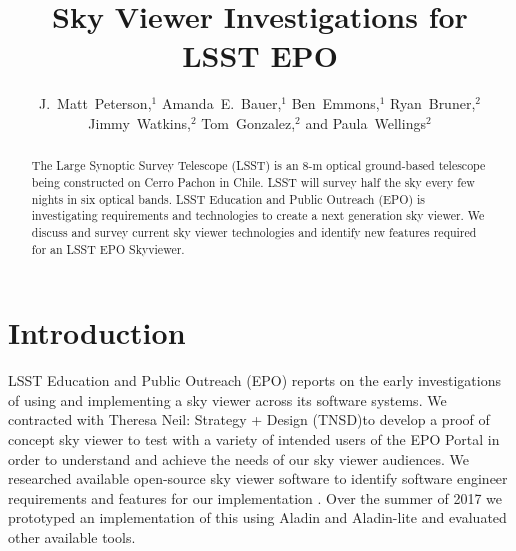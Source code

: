 \documentclass[11pt,twoside]{article}
\begin{document}
\title{Sky Viewer Investigations for LSST EPO}

\author{J.~Matt~Peterson,$^1$ Amanda~E.~Bauer,$^1$ Ben~Emmons,$^1$ Ryan~Bruner,$^2$ Jimmy~Watkins,$^2$ Tom~Gonzalez,$^2$ and Paula~Wellings$^2$}


\begin{abstract}
The Large Synoptic Survey Telescope (LSST) is an 8-m optical ground-based telescope being constructed on Cerro Pachon in Chile. LSST will survey half the sky every few nights in six optical bands. LSST Education and Public Outreach (EPO) is investigating requirements and technologies to create a next generation sky viewer. We discuss and survey current sky viewer technologies and identify new features required for an LSST EPO Skyviewer.
\end{abstract}

\section{Introduction}
LSST Education and Public Outreach (EPO) reports on the early investigations of using and implementing a sky viewer across its software systems. We contracted with Theresa Neil: Strategy + Design (TNSD)\footnotemark[1] to develop a proof of concept sky viewer to test with a variety of intended users of the EPO Portal in order to understand and achieve the needs of our sky viewer audiences. We researched available open-source sky viewer software to identify software engineer requirements and features for our implementation \citep{2017LSST.1.LSE-89,2017LSST.1.LEP-31}. Over the summer of 2017 we prototyped an implementation of this using Aladin and Aladin-lite \citep{2014ASPC..485..277B} and evaluated other available tools.
\end{document}
